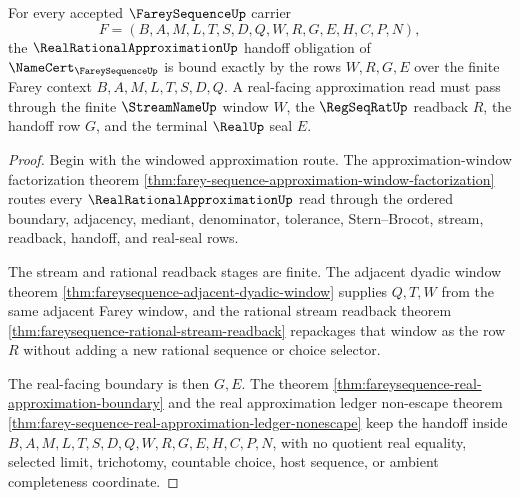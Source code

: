\begin{theorem}
\label{thm:farey-sequence-approximation-obligation}
For every accepted $\FareySequenceUp$ carrier
$$
F=(B,A,M,L,T,S,D,Q,W,R,G,E,H,C,P,N),
$$
the $\RealRationalApproximationUp$ handoff obligation of $\NameCert_{\FareySequenceUp}$ is bound exactly by the rows $W,R,G,E$ over the finite Farey context $B,A,M,L,T,S,D,Q$. A real-facing approximation read must pass through the finite $\StreamNameUp$ window $W$, the $\RegSeqRatUp$ readback $R$, the handoff row $G$, and the terminal $\RealUp$ seal $E$.
\end{theorem}
\begin{proof}
Begin with the windowed approximation route. The approximation-window factorization theorem \autoref{thm:farey-sequence-approximation-window-factorization} routes every $\RealRationalApproximationUp$ read through the ordered boundary, adjacency, mediant, denominator, tolerance, Stern--Brocot, stream, readback, handoff, and real-seal rows.

The stream and rational readback stages are finite. The adjacent dyadic window theorem \autoref{thm:fareysequence-adjacent-dyadic-window} supplies $Q,T,W$ from the same adjacent Farey window, and the rational stream readback theorem \autoref{thm:fareysequence-rational-stream-readback} repackages that window as the row $R$ without adding a new rational sequence or choice selector.

The real-facing boundary is then $G,E$. The theorem \autoref{thm:fareysequence-real-approximation-boundary} and the real approximation ledger non-escape theorem \autoref{thm:farey-sequence-real-approximation-ledger-nonescape} keep the handoff inside $B,A,M,L,T,S,D,Q,W,R,G,E,H,C,P,N$, with no quotient real equality, selected limit, trichotomy, countable choice, host sequence, or ambient completeness coordinate.
\end{proof}
